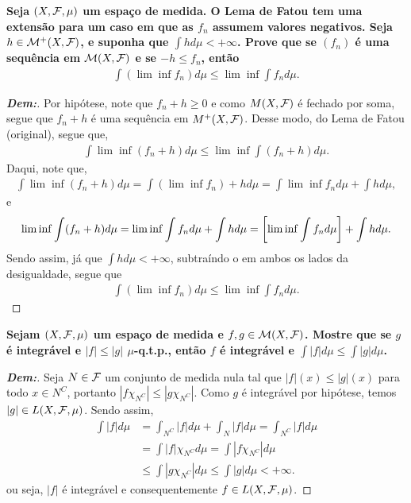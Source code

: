 \textbf{
  Seja $(X, \mathcal F, \mu)$ um espaço de medida. O Lema de Fatou tem uma extensão 
  para um caso em que as $f_n$ assumem valores negativos. Seja 
  $h \in \mathcal M^+(X, \mathcal F)$, e suponha que $\int h d\mu < + \infty$. Prove que 
  se $(f_n)$ é uma sequência em $\mathcal M(X, \mathcal F)$ e se $-h \le f_n$, então 
  \begin{align*}
    \int (\lim \inf f_n) d\mu \le \lim \inf \int f_n d\mu.
  \end{align*}
}
\begin{proof}[\textbf{Dem:}]
Por hipótese, note que $f_n + h \ge 0$ e como $M(X, \mathcal F)$
  é fechado por soma, segue que $f_n+h$ é uma sequência em $M^+(X, \mathcal F)$. Desse modo, 
  do Lema de Fatou (original), segue que, 
  \begin{align*}
    \int \lim \inf (f_n + h) d\mu \le \lim \inf \int (f_n + h) d\mu.
  \end{align*}
  Daqui, note que,
  \begin{align*}
    \int \lim \inf (f_n +h) d\mu = \int (\lim \inf f_n) + h d\mu = \int \lim \inf f_n d\mu 
    + \int h d\mu,
  \end{align*}
  e 
  \begin{align*}
    \lim \inf \int (f_n + h) d\mu = \lim \inf \int f_n d\mu + \int h d\mu 
    = \left[\lim \inf \int f_n d\mu\right] + \int h d\mu.
  \end{align*}
  Sendo assim, já que $\int h d\mu < + \infty$, subtraíndo o em ambos os lados da 
  desigualdade, segue que
  \begin{align*}
    \int (\lim \inf f_n) d\mu \le \lim \inf \int f_n d\mu.
  \end{align*}
\end{proof}

\textbf{Sejam $(X, \mathcal F, \mu)$ um espaço de medida e $f, g \in \mathcal M(X, \mathcal F)$. 
Mostre que se $g$ é integrável e $|f| \le |g|$ $\mu$-q.t.p., então $f$ é integrável 
e $\int |f| d\mu \le \int |g| d\mu$.}
\begin{proof}[\textbf{Dem:}] Seja $N \in \mathcal F$ um conjunto de medida nula tal que 
  $|f|(x) \le |g|(x)$ para todo $x \in N^C$, portanto $|f\chi_{N^C}| \le |g\chi_{N^C}|$.
  Como $g$ é integrável por hipótese, temos $|g| \in L(X, \mathcal F, \mu)$. Sendo assim, 
  \begin{align*}
    \int |f| d\mu &= \int_{N^C} |f| d\mu + \int_{N} |f| d\mu = \int_{N^C} |f| d\mu\\
    &=\int |f|\chi_{N^C} d\mu = \int |f\chi_{N^C}| d\mu\\ 
    &\le \int |g\chi_{N^C}| d\mu \le \int |g| d\mu < +\infty.
  \end{align*}
  ou seja, $|f|$ é integrável e consequentemente $f \in L(X, \mathcal F, \mu)$. 
\end{proof}

